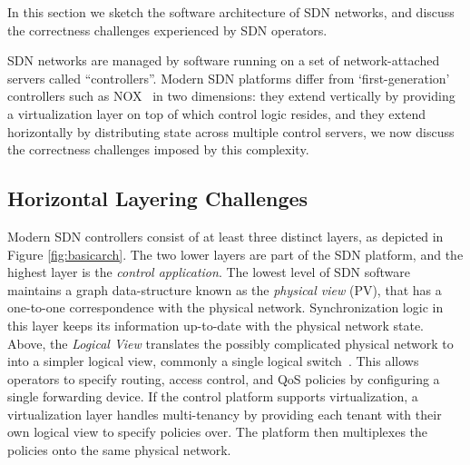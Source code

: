 In this section we sketch the software architecture of SDN networks, and discuss
the correctness challenges experienced by SDN operators.

SDN networks are managed by software running on a set of network-attached
servers called ``controllers''. Modern SDN platforms differ from
`first-generation' controllers such as NOX~\cite{nox} in two dimensions: they
extend vertically by providing a virtualization layer on top of which control
logic resides, and they extend horizontally by distributing state across
multiple control servers, we now discuss the correctness challenges imposed by
this complexity.




\subsection{Horizontal Layering Challenges}
Modern SDN controllers consist of at least three distinct layers, as depicted in
Figure \ref{fig:basicarch}. The two lower layers are part of the SDN platform,
and the highest layer is the \emph{control application}. The lowest level of SDN
software maintains a graph data-structure known as the \emph{physical view}
(PV), that has a one-to-one correspondence with the physical network.
Synchronization logic in this layer keeps its information up-to-date with the
physical network state. Above, the \emph{Logical View} translates the possibly
complicated physical network to into a simpler logical view, commonly a single
logical switch~\cite{Casado:2010:VNF:1921151.1921162}. This allows operators to
specify routing, access control, and QoS policies by configuring a single
forwarding device. If the control platform supports virtualization, a
virtualization layer handles multi-tenancy by providing each tenant with their
own logical view to specify policies over. The platform then multiplexes the
policies onto the same physical network.

